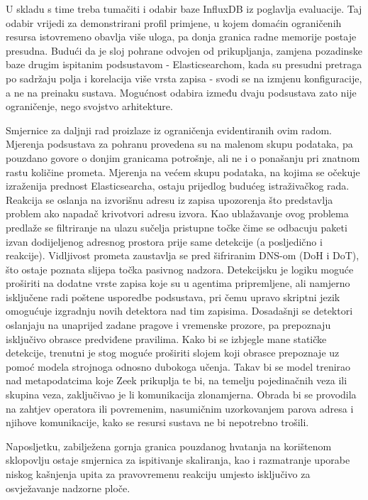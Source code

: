 U skladu s time treba tumačiti i odabir baze InfluxDB iz poglavlja evaluacije. Taj odabir vrijedi za demonstrirani profil primjene, u kojem domaćin ograničenih 
resursa istovremeno obavlja više uloga, pa donja granica radne memorije postaje presudna. Budući da je sloj pohrane odvojen od prikupljanja, zamjena pozadinske 
baze drugim ispitanim podsustavom - Elasticsearchom, kada su presudni pretraga po sadržaju polja i korelacija više vrsta zapisa - svodi se na izmjenu 
konfiguracije, a ne na preinaku sustava. Mogućnost odabira između dvaju podsustava zato nije ograničenje, nego svojstvo arhitekture.

Smjernice za daljnji rad proizlaze iz ograničenja evidentiranih ovim radom. Mjerenja podsustava za pohranu provedena su na malenom skupu podataka, pa pouzdano 
govore o donjim granicama potrošnje, ali ne i o ponašanju pri znatnom rastu količine prometa. Mjerenja na većem skupu podataka, na kojima se očekuje izraženija
prednost Elasticsearcha, ostaju prijedlog budućeg istraživačkog rada.
Reakcija se oslanja na izvorišnu adresu iz zapisa upozorenja što predstavlja problem ako napadač krivotvori adresu izvora. Kao ublažavanje ovog problema predlaže se
filtriranje na ulazu sučelja pristupne točke čime se odbacuju paketi izvan dodijeljenog adresnog prostora prije same detekcije (a posljedično i reakcije).
Vidljivost prometa zaustavlja se pred šifriranim DNS-om (DoH i DoT), što ostaje poznata slijepa točka pasivnog nadzora.
Detekcijsku je logiku moguće proširiti na dodatne vrste zapisa koje su u agentima pripremljene, ali namjerno isključene radi poštene usporedbe podsustava, pri 
čemu upravo skriptni jezik omogućuje izgradnju novih detektora nad tim zapisima. Dosadašnji se detektori oslanjaju na unaprijed zadane pragove i vremenske 
prozore, pa prepoznaju isključivo obrasce predviđene pravilima. Kako bi se izbjegle mane statičke detekcije, trenutni je stog moguće proširiti slojem koji 
obrasce prepoznaje uz pomoć modela strojnoga odnosno dubokoga učenja. Takav bi se model trenirao nad metapodatcima koje Zeek prikuplja te bi, na temelju 
pojedinačnih veza ili skupina veza, zaključivao je li komunikacija zlonamjerna. Obrada bi se provodila na zahtjev operatora ili povremenim, nasumičnim 
uzorkovanjem parova adresa i njihove komunikacije, kako se resursi sustava ne bi nepotrebno trošili.

Naposljetku, zabilježena gornja granica pouzdanog hvatanja na korištenom sklopovlju ostaje smjernica za ispitivanje skaliranja, kao i razmatranje uporabe
niskog kašnjenja upita za pravovremenu reakciju umjesto isključivo za osvježavanje nadzorne ploče.